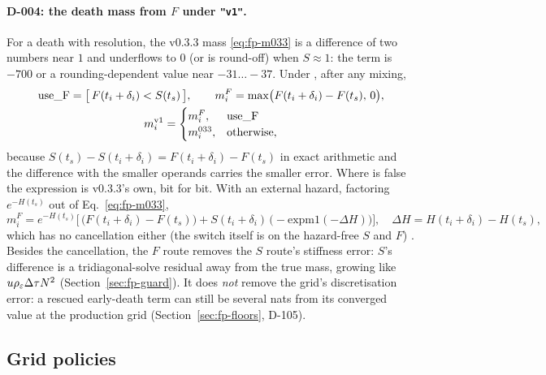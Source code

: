 \paragraph{D-004: the death mass from $F$ under \texttt{"v1"}.} For a death with resolution, the v0.3.3 mass
\eqref{eq:fp-m033} is a difference of two numbers near $1$ and underflows to $0$ (or is round-off) when $S\approx1$:
the term is $-700$ or a rounding-dependent value near $-31\ldots-37$. Under , after any mixing,
\begin{equation}
  \begin{gathered}\text{use\_F}=\big[\,F(t_i+\delta_i)<S(t_s)\,\big],\qquad
  m_i^F=\max\!\big(F(t_i+\delta_i)-F(t_s),\,0\big),\\
  m_i^{\rm v1}=\begin{cases}m_i^F,&\text{use\_F}\\ m_i^{033},&\text{otherwise,}\end{cases}\end{gathered}
\end{equation}
because $S(t_s)-S(t_i+\delta_i)=F(t_i+\delta_i)-F(t_s)$ in exact arithmetic and the difference with the smaller
operands carries the smaller error. Where  is false the expression is v0.3.3's own, bit for bit.
With an external hazard, factoring $e^{-H(t_s)}$ out of Eq.~\eqref{eq:fp-m033},
\begin{equation}
  m_i^F=e^{-H(t_s)}\Big[\,\big(F(t_i+\delta_i)-F(t_s)\big)+S(t_i+\delta_i)\,\big(-\mathrm{expm1}(-\Delta H)\big)\Big],\quad
  \Delta H=H(t_i+\delta_i)-H(t_s),
\end{equation}
which has no cancellation either (the switch itself is on the hazard-free $S$ and $F$)
. Besides the cancellation, the $F$ route removes the $S$ route's stiffness
error: $S$'s difference is a tridiagonal-solve residual away from the true mass, growing like $u\rho_\varepsilon\Delta\tau N^2$
(Section~\ref{sec:fp-guard}). It does \emph{not} remove the grid's discretisation error: a rescued early-death term can
still be several nats from its converged value at the production grid (Section~\ref{sec:fp-floors}, D-105).

\subsection{Grid policies}\label{sec:fp-grid}


